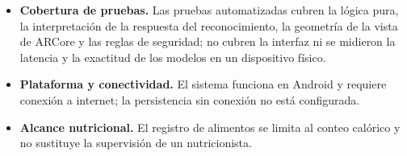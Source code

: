 \begin{itemize}
    \item \textbf{Cobertura de pruebas.} Las pruebas automatizadas cubren la
    lógica pura, la interpretación de la respuesta del reconocimiento, la
    geometría de la vista de ARCore y las reglas de seguridad; no cubren la
    interfaz ni se midieron la latencia y la exactitud de los modelos en un
    dispositivo físico.
    \item \textbf{Plataforma y conectividad.} El sistema funciona en Android y
    requiere conexión a internet; la persistencia sin conexión no está
    configurada.
    \item \textbf{Alcance nutricional.} El registro de alimentos se limita al
    conteo calórico y no sustituye la supervisión de un nutricionista.
\end{itemize}
